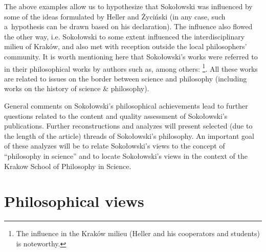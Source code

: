 \documentclass[%
  manuscript=article,
  year=2024,
  volume=77,
  doi=10.59203/zfn.77.689,
]{zfn}
\begin{document}
The above examples allow us to hypothesize that Sokołowski was influenced by some of the ideas formulated by Heller and Życiński (in any case, such a~hypothesis can be drawn based on his declaration). The influence also flowed the other way, i.e. Sokołowski to some extent influenced the interdisciplinary milieu of Kraków, and also met with reception outside the local philosophers' community. It is worth mentioning here that Sokołowski's works were referred to in their philosophical works by authors such as, among others: 
\parencites[][]{Burtyn1997Idea}[][]{Turek2005Filozofia}[][]{Jodkowski2007Spor}[][]{Filipek2008Elementy}[][]{Czerniawski2009Ruch}[][]{Czerniawski2012Protofizyka}[][]{Zycinski2009Wszechswiat}[][]{Grygiel2010Teoria}[][]{Szydowski2010Prostota}[][]{Szydowski2015Ontologiczne}[][]{Szydowski2020Czy}[][]{Heller2013Filozofia}[][]{Heller2014Granice}[][]{Pabjan2013Filozoficzne}[][]{Hoda2014Teistyczne}[][]{Dabek2016Nauka}[][]{Janowski2016Zagadnienie}[][]{Janusz2017Stulecie}[][]{Jacyna2018Kosmologia}[][]{Sobkowiak2019Relacje}[][]{Lemanska2020Mathematicalness}[][]{Trombik2021Koncepcje}%
\footnote{The influence in the Kraków milieu (Heller and his cooperators and students) is noteworthy.}. All these works are related to issues on the border between science and philosophy (including works on the history of science \& philosophy).



General comments on Sokołowski's philosophical achievements lead to further questions related to the content and quality assessment of Sokołowski's publications. Further reconstructions and analyzes will present selected (due to the length of the article) threads of Sokołowski's philosophy. An important goal of these analyzes will be to relate Sokołowski's views to the concept of ``philosophy in science'' and to locate Sokołowski's views in the context of the Krakow School of Philosophy in Science.



\section{Philosophical views}
\end{document}
